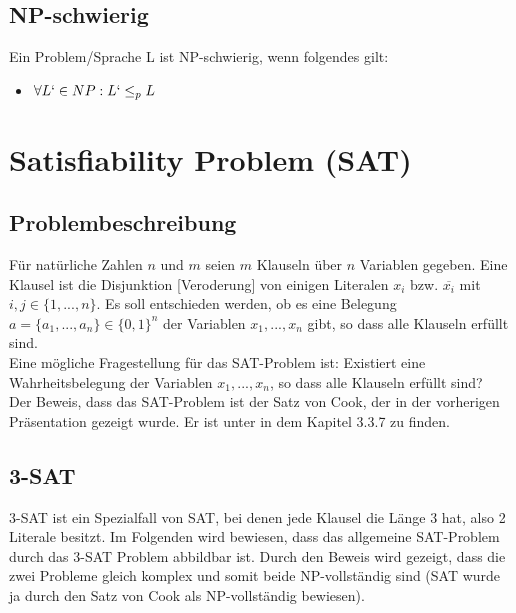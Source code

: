 \documentclass[ngerman]{article}
\begin{document}
\subsection{NP-schwierig}
Ein Problem/Sprache L ist NP-schwierig, wenn folgendes gilt:\\
\begin{itemize}
\item $\forall L` \in NP: L` \leq_p L$
\end{itemize}

\section{Satisfiability Problem (SAT)}
\subsection{Problembeschreibung}
Für natürliche Zahlen \(n\) und \(m\) seien \(m\) Klauseln über \(n\) Variablen gegeben.
Eine Klausel ist die Disjunktion [Veroderung] von einigen Literalen \(x_i\) bzw. \(\overline{x_i}\) mit \(i,j \in \{1,...,n\}\). Es soll entschieden werden, ob es eine Belegung \(a = \{a_1,...,a_n\} \in \{0,1\}^n\) der Variablen \(x_1,...,x_n\) gibt, so dass alle Klauseln erfüllt sind.\\
Eine mögliche Fragestellung für das SAT-Problem ist: Existiert eine Wahrheitsbelegung der Variablen \(x_1,...,x_n\), so dass alle Klauseln erfüllt sind?\\
Der Beweis, dass das SAT-Problem ist der Satz von Cook, der in der vorherigen Präsentation gezeigt wurde. Er ist unter \cite{wegener} in dem Kapitel 3.3.7 zu finden.
\subsection{3-SAT}
3-SAT ist ein Spezialfall von SAT, bei denen jede Klausel die Länge 3 hat, also 2 Literale besitzt.
Im Folgenden wird bewiesen, dass das allgemeine SAT-Problem durch das 3-SAT Problem abbildbar ist.
Durch den Beweis wird gezeigt, dass die zwei Probleme gleich komplex und somit beide NP-vollständig sind (SAT wurde ja durch den Satz von Cook als NP-vollständig bewiesen).
\end{document}
